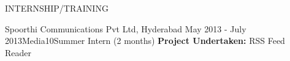 \documentclass{resume} %
\begin{document}
\begin{rSection}{INTERNSHIP/TRAINING}
  \begin{rSubsection}
  {Spoorthi Communications Pvt Ltd, Hyderabad} {May 2013 - July
    2013}{Media10}{Summer Intern (2 months)}
  \textbf{Project Undertaken:} RSS Feed Reader
  \end{rSubsection} 

\end{rSection} 





 
\end{document}
